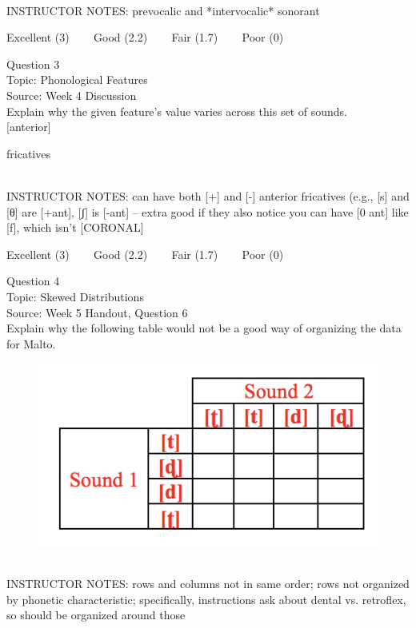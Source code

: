 \documentclass[12pt]{article}
\begin{document}
~\\
INSTRUCTOR NOTES: prevocalic and *intervocalic* sonorant


\vfill
Excellent (3) ~~~ Good (2.2) ~~~ Fair (1.7) ~~~ Poor (0)
\newpage

{\large Question 3}\\

Topic: Phonological Features\\
Source: Week 4 Discussion\\

Explain why the given feature's value varies across this set of sounds.\\

{[anterior]}

fricatives


~\\
INSTRUCTOR NOTES: can have both [+] and [-] anterior fricatives (e.g., [s] and [θ] are [+ant], [ʃ] is [-ant] -- extra good if they also notice you can have [0 ant] like [f], which isn't [CORONAL]


\vfill
Excellent (3) ~~~ Good (2.2) ~~~ Fair (1.7) ~~~ Poor (0)
\newpage

{\large Question 4}\\

Topic: Skewed Distributions\\
Source: Week 5 Handout, Question 6\\

Explain why the following table would not be a good way of organizing the data for Malto.\\

\begin{figure}[H]
\includegraphics{../images/Malto_table_bad.png}
\end{figure}

~\\
INSTRUCTOR NOTES: rows and columns not in same order; rows not organized by phonetic characteristic; specifically, instructions ask about dental vs. retroflex, so should be organized around those
\end{document}
